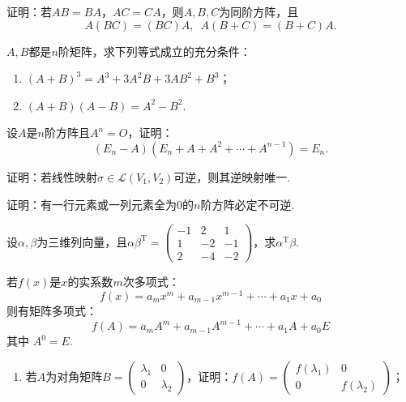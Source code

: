\begin{exercise}

    \begin{exgroup}
        \item 证明：若$AB=BA$，$AC=CA$，则$A,B,C$为同阶方阵，且
        \[A(BC)=(BC)A,\enspace A(B+C)=(B+C)A.\]

        \item $A,B$都是$n$阶矩阵，求下列等式成立的充分条件：
        \begin{enumerate}
            \item $(A+B)^3=A^3+3A^2B+3AB^2+B^3$；

            \item $(A+B)(A-B)=A^2-B^2$.
        \end{enumerate}

        \item 设$A$是$n$阶方阵且$A^n=O$，证明：
        \[(E_n-A)(E_n+A+A^2+\cdots+A^{n-1})=E_n.\]

        \item 证明：若线性映射$\sigma \in \mathcal{L}(V_1,V_2)$可逆，则其逆映射唯一.

        \item 证明：有一行元素或一列元素全为0的$n$阶方阵必定不可逆.

        \item 设$\alpha,\beta$为三维列向量，且$\alpha\beta^\mathrm{T}=\begin{pmatrix}
                -1 & 2  & 1  \\
                1  & -2 & -1 \\
                2  & -4 & -2
            \end{pmatrix}$，求$\alpha^\mathrm{T}\beta$.
    \end{exgroup}

    \begin{exgroup}
        \item 若$f(x)$是$x$的实系数$m$次多项式：
        \[f(x)=a_mx^m+a_{m-1}x^{m-1}+\cdots+a_1x+a_0\]
        则有矩阵多项式：
        \[f(A)=a_mA^m+a_{m-1}A^{m-1}+\cdots+a_1A+a_0E\]
        其中 $A^0=E$.
        \begin{enumerate}
            \item 若$A$为对角矩阵$B=\begin{pmatrix}
                          \lambda_1 & 0 \\ 0 & \lambda_2
                      \end{pmatrix}$，证明：$f(A)=\begin{pmatrix}
                          f(\lambda_1) & 0 \\ 0 & f(\lambda_2)
                      \end{pmatrix}$；


\end{enumerate}
\end{exgroup}
\end{exercise}
